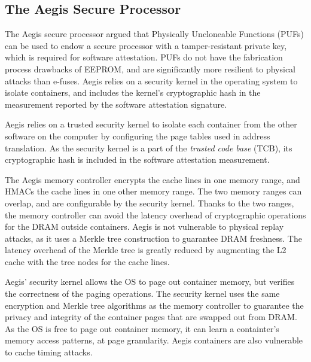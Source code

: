 \subsection{The Aegis Secure Processor}

The Aegis secure processor \cite{suh2003aegis} argued that Physically
Uncloneable Functions (PUFs) \cite{gassend2002puf} can be used to endow a
secure processor with a tamper-resistant private key, which is required for
software attestation. PUFs do not have the fabrication process drawbacks of
EEPROM, and are significantly more resilient to physical attacks than e-fuses.
Aegis relies on a security kernel in the operating system to isolate
containers, and includes the kernel's cryptographic hash in the measurement
reported by the software attestation signature.

Aegis relies on a trusted security kernel to isolate each container from the
other software on the computer by configuring the page tables used in address
translation. As the security kernel is a part of the \textit{trusted code base}
(TCB), its cryptographic hash is included in the software attestation
measurement.

The Aegis memory controller encrypts the cache lines in one memory range, and
HMACs the cache lines in one other memory range. The two memory ranges can
overlap, and are configurable by the security kernel. Thanks to the two ranges,
the memory controller can avoid the latency overhead of cryptographic
operations for the DRAM outside containers. Aegis is not vulnerable to physical
replay attacks, as it uses a Merkle tree construction \cite{gassend2003merkle}
to guarantee DRAM freshness. The latency overhead of the Merkle tree is greatly
reduced by augmenting the L2 cache with the tree nodes for the cache lines.

Aegis' security kernel allows the OS to page out container memory, but verifies
the correctness of the paging operations. The security kernel uses the same
encryption and Merkle tree algorithms as the memory controller to guarantee the
privacy and integrity of the container pages that are swapped out from DRAM.
As the OS is free to page out container memory, it can learn a containter's
memory access patterns, at page granularity. Aegis containers are also
vulnerable to cache timing attacks.
